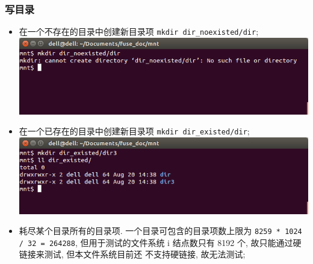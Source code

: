 \documentclass[nofonts, titlepage]{ctexart}
\begin{document}
\subsubsection{写目录}
\begin{itemize}
\item
  在一个不存在的目录中创建新目录项 \texttt{mkdir dir\_noexisted/dir};\\
  \includegraphics[width=14cm]{./images/./write_dir_t1.png}
\item
  在一个已存在的目录中创建新目录项 \texttt{mkdir dir\_existed/dir};\\
  \includegraphics[width=14cm]{./images/./write_dir_t2.png}
\item
  耗尽某个目录所有的目录项. 一个目录可包含的目录项数上限为
  \texttt{8259 * 1024 / 32 = 264288}, 但用于测试的文件系统 i 结点数只有
  8192 个, 故只能通过硬链接来测试, 但本文件系统目前还 不支持硬链接,
  故无法测试;
\end{itemize}
\end{document}
